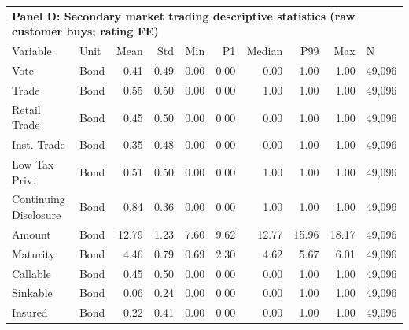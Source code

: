 \begin{table}[H]
\centering
\begin{tabular*}{\textwidth}{@{\extracolsep{\fill}}llrrrrrrrl}
\multicolumn{10}{l}{\textbf{Panel D: Secondary market trading descriptive statistics (raw customer buys; rating FE)}}\\

\addlinespace
  \toprule
Variable & Unit & Mean & Std & Min & P1 & Median & P99 & Max & N \\ 
  \hline
Vote & Bond & 0.41 & 0.49 & 0.00 & 0.00 & 0.00 & 1.00 & 1.00 & 49,096 \\ 
  Trade & Bond & 0.55 & 0.50 & 0.00 & 0.00 & 1.00 & 1.00 & 1.00 & 49,096 \\ 
  Retail Trade & Bond & 0.45 & 0.50 & 0.00 & 0.00 & 0.00 & 1.00 & 1.00 & 49,096 \\ 
  Inst. Trade & Bond & 0.35 & 0.48 & 0.00 & 0.00 & 0.00 & 1.00 & 1.00 & 49,096 \\ 
  Low Tax Priv. & Bond & 0.51 & 0.50 & 0.00 & 0.00 & 1.00 & 1.00 & 1.00 & 49,096 \\ 
  Continuing Disclosure & Bond & 0.84 & 0.36 & 0.00 & 0.00 & 1.00 & 1.00 & 1.00 & 49,096 \\ 
  Amount & Bond & 12.79 & 1.23 & 7.60 & 9.62 & 12.77 & 15.96 & 18.17 & 49,096 \\ 
  Maturity & Bond & 4.46 & 0.79 & 0.69 & 2.30 & 4.62 & 5.67 & 6.01 & 49,096 \\ 
  Callable & Bond & 0.45 & 0.50 & 0.00 & 0.00 & 0.00 & 1.00 & 1.00 & 49,096 \\ 
  Sinkable & Bond & 0.06 & 0.24 & 0.00 & 0.00 & 0.00 & 1.00 & 1.00 & 49,096 \\ 
  Insured & Bond & 0.22 & 0.41 & 0.00 & 0.00 & 0.00 & 1.00 & 1.00 & 49,096 \\ 
   \hline
\end{tabular*}
\end{table}
